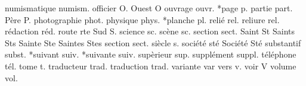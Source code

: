 numismatique        numism.%
officier            O.%
{Ouest}             O%
ouvrage             ouvr.%
*page               p.%
partie              part.%
Père                P.%
photographie        phot.%
physique            phys.%
*planche            pl.%
relié             rel.%
reliure             rel.%
rédaction         réd.
route               rte%
{Sud}               S.%
science             sc.%
scène               sc.%
section             sect.%
{Saint}             St%
{Saints}            Sts%
{Sainte}            Ste%
{Saintes}           Stes%
section             sect.%
siècle             s.%
{société}           sté%
{Société}           Sté%
substantif          subst.%
*suivant            suiv.%
*suivante           suiv.%
supèrieur           sup.%
supplément          suppl.%
téléphone           tél.%
tome                t.%
traducteur          trad.%
traduction          trad.%
variante            var%
vers                v.%
voir                V%
volume              vol.%


